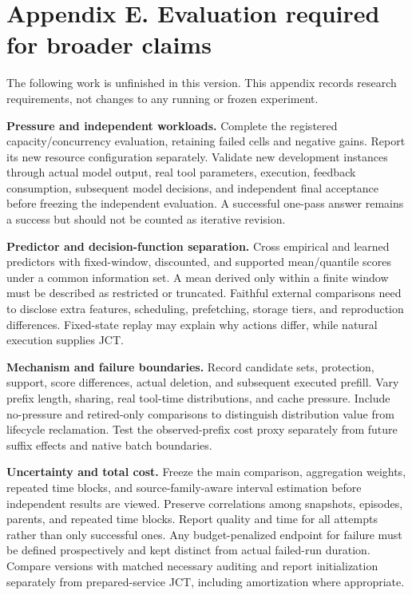 \documentclass[
  english,
  10pt,
]{article}
\begin{document}
\section{Appendix E. Evaluation required for broader
claims}\label{appendix-e.-evaluation-required-for-broader-claims}

The following work is unfinished in this version. This appendix records
research requirements, not changes to any running or frozen experiment.

\textbf{Pressure and independent workloads.} Complete the registered
capacity/concurrency evaluation, retaining failed cells and negative
gains. Report its new resource configuration separately. Validate new
development instances through actual model output, real tool parameters,
execution, feedback consumption, subsequent model decisions, and
independent final acceptance before freezing the independent evaluation.
A successful one-pass answer remains a success but should not be counted
as iterative revision.

\textbf{Predictor and decision-function separation.} Cross empirical and
learned predictors with fixed-window, discounted, and supported
mean/quantile scores under a common information set. A mean derived only
within a finite window must be described as restricted or truncated.
Faithful external comparisons need to disclose extra features,
scheduling, prefetching, storage tiers, and reproduction differences.
Fixed-state replay may explain why actions differ, while natural
execution supplies JCT.

\textbf{Mechanism and failure boundaries.} Record candidate sets,
protection, support, score differences, actual deletion, and subsequent
executed prefill. Vary prefix length, sharing, real tool-time
distributions, and cache pressure. Include no-pressure and retired-only
comparisons to distinguish distribution value from lifecycle
reclamation. Test the observed-prefix cost proxy separately from future
suffix effects and native batch boundaries.

\textbf{Uncertainty and total cost.} Freeze the main comparison,
aggregation weights, repeated time blocks, and source-family-aware
interval estimation before independent results are viewed. Preserve
correlations among snapshots, episodes, parents, and repeated time
blocks. Report quality and time for all attempts rather than only
successful ones. Any budget-penalized endpoint for failure must be
defined prospectively and kept distinct from actual failed-run duration.
Compare versions with matched necessary auditing and report
initialization separately from prepared-service JCT, including
amortization where appropriate.
\end{document}
